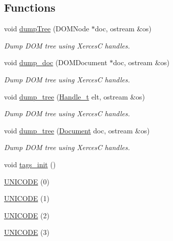 \subsection*{Functions}
\begin{DoxyCompactItemize}
\item 
void \hyperlink{namespace_d_d4hep_1_1_x_m_l_a5378d08fbf2f2c9e495fc772360b62d8}{dump\+Tree} (D\+O\+M\+Node $\ast$doc, ostream \&os)
\begin{DoxyCompactList}\small\item\em Dump D\+OM tree using XercesC handles. \end{DoxyCompactList}\item 
void \hyperlink{namespace_d_d4hep_1_1_x_m_l_ae465472cdddbe11a365f14b04b15b191}{dump\+\_\+doc} (D\+O\+M\+Document $\ast$doc, ostream \&os)
\begin{DoxyCompactList}\small\item\em Dump D\+OM tree using XercesC handles. \end{DoxyCompactList}\item 
void \hyperlink{namespace_d_d4hep_1_1_x_m_l_a1130069b87e258d98105350c812835dd}{dump\+\_\+tree} (\hyperlink{class_d_d4hep_1_1_x_m_l_1_1_handle__t}{Handle\+\_\+t} elt, ostream \&os)
\begin{DoxyCompactList}\small\item\em Dump D\+OM tree using XercesC handles. \end{DoxyCompactList}\item 
void \hyperlink{namespace_d_d4hep_1_1_x_m_l_a890f94a51fe7c0a877ec482ec35caaf9}{dump\+\_\+tree} (\hyperlink{class_d_d4hep_1_1_x_m_l_1_1_document}{Document} doc, ostream \&os)
\begin{DoxyCompactList}\small\item\em Dump D\+OM tree using XercesC handles. \end{DoxyCompactList}\item 
void \hyperlink{namespace_d_d4hep_1_1_x_m_l_af7aa83aefe34bc63c5dd562d27340edd}{tags\+\_\+init} ()
\item 
\hyperlink{namespace_d_d4hep_1_1_x_m_l_a93070fb4882b0fcf3726cc26cc153107}{U\+N\+I\+C\+O\+DE} (0)
\item 
\hyperlink{namespace_d_d4hep_1_1_x_m_l_adf9293344b1af9d8e590c4992702e11e}{U\+N\+I\+C\+O\+DE} (1)
\item 
\hyperlink{namespace_d_d4hep_1_1_x_m_l_a43539455d51d957b9af79253c6b86d31}{U\+N\+I\+C\+O\+DE} (2)
\item 
\hyperlink{namespace_d_d4hep_1_1_x_m_l_a6585bb1bddfc87d5b6922f8378eae3d4}{U\+N\+I\+C\+O\+DE} (3)

\end{DoxyCompactItemize}

